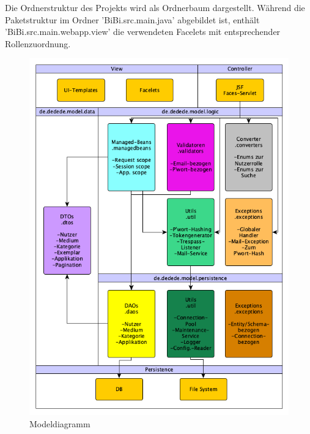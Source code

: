 \documentclass{article}
\begin{document}
Die Ordnerstruktur des Projekts wird als Ordnerbaum dargestellt.
Während die Paketstruktur im Ordner 'BiBi.src.main.java' abgebildet ist, enthält 'BiBi.src.main.webapp.view' die verwendeten Facelets mit entsprechender Rollenzuordnung. \vspace{0.5em}

\begin{figure}[H]
\centering
\includegraphics[width = 40em]{Modeldiagramm}
\caption{Modeldiagramm}
\end{figure}	
	
\end{document}
